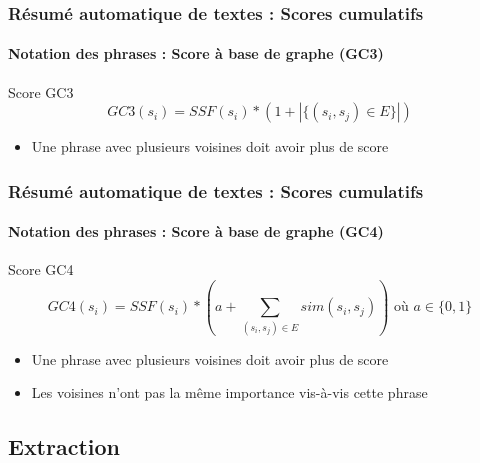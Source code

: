 \documentclass[xcolor=table]{beamer}
\begin{document}
\begin{frame}
\frametitle{Résumé automatique de textes : Scores cumulatifs}
\framesubtitle{Notation des phrases : Score à base de graphe (GC3)}

\begin{block}{Score GC3}
	\[GC3(s_i) = SSF(s_i) * (1 + |\{(s_i, s_j) \in E\}|)\]
\end{block}
\begin{itemize}
	\item Une phrase avec plusieurs voisines doit avoir plus de score  
\end{itemize}
%		
%		
	
\end{frame}

\begin{frame}
\frametitle{Résumé automatique de textes : Scores cumulatifs}
\framesubtitle{Notation des phrases : Score à base de graphe (GC4)}
	
\begin{block}{Score GC4}
	\[GC4(s_i) = SSF(s_i) * ( a + \sum\limits_{(s_i, s_j) \in E} sim(s_i, s_j)) \text{ où } a \in \{0, 1\}\]
\end{block}
\begin{itemize}
	\item Une phrase avec plusieurs voisines doit avoir plus de score 
	\item Les voisines n'ont pas la même importance vis-à-vis cette phrase
\end{itemize}
%		
%		

\end{frame}

\subsection{Extraction} 
\end{document}
